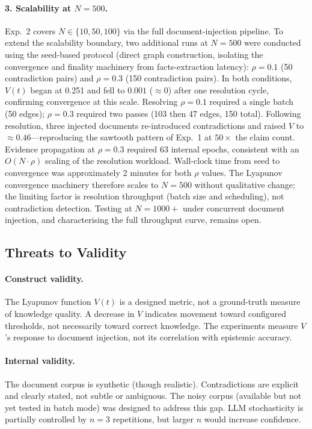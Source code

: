 \documentclass[11pt]{article}
\begin{document}
\paragraph{3. Scalability at $N = 500$.} Exp.~2 covers $N \in \{10, 50, 100\}$ via the full document-injection pipeline. To extend the scalability boundary, two additional runs at $N = 500$ were conducted using the seed-based protocol (direct graph construction, isolating the convergence and finality machinery from facts-extraction latency): $\rho = 0.1$ (50 contradiction pairs) and $\rho = 0.3$ (150 contradiction pairs). In both conditions, $V(t)$ began at 0.251 and fell to $\mathbf{0.001}$ ($\approx 0$) after one resolution cycle, confirming convergence at this scale. Resolving $\rho = 0.1$ required a single batch (50 edges); $\rho = 0.3$ required two passes (103 then 47 edges, 150 total). Following resolution, three injected documents re-introduced contradictions and raised $V$ to $\approx 0.46$---reproducing the sawtooth pattern of Exp.~1 at $50\times$ the claim count. Evidence propagation at $\rho = 0.3$ required 63 internal epochs, consistent with an $O(N \cdot \rho)$ scaling of the resolution workload. Wall-clock time from seed to convergence was approximately 2 minutes for both $\rho$ values. The Lyapunov convergence machinery therefore scales to $N = 500$ without qualitative change; the limiting factor is resolution throughput (batch size and scheduling), not contradiction detection. Testing at $N = 1000+$ under concurrent document injection, and characterising the full throughput curve, remains open.

\subsection{Threats to Validity}

\paragraph{Construct validity.} The Lyapunov function $V(t)$ is a designed metric, not a ground-truth measure of knowledge quality. A decrease in $V$ indicates movement toward configured thresholds, not necessarily toward correct knowledge. The experiments measure $V$'s response to document injection, not its correlation with epistemic accuracy.

\paragraph{Internal validity.} The document corpus is synthetic (though realistic). Contradictions are explicit and clearly stated, not subtle or ambiguous. The noisy corpus (available but not yet tested in batch mode) was designed to address this gap. LLM stochasticity is partially controlled by $n = 3$ repetitions, but larger $n$ would increase confidence.
\end{document}
